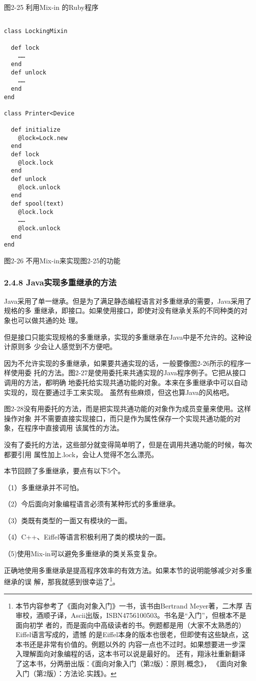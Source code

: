 \documentclass[11pt]{ctexart}
\begin{document}
图2-25 利用Mix-in 的Ruby程序

\lstset{language=org,label= ,caption= ,captionpos=b,numbers=none}
\begin{lstlisting}

class LockingMixin

  def lock
    ……
  end
  def unlock 
    ……
  end
end

class Printer<Device

  def initialize
    @lock=Lock.new
  end
  def lock
    @lock.lock
  end
  def unlock
    @lock.unlock
  end
  def spool(text)
    @lock.lock
    ……
    @lock.unlock
  end
end
\end{lstlisting}

图2-26 不用Mix-in来实现图2-25的功能
\subsubsection{2.4.8 Java实现多重继承的方法}
\label{sec:org2194c7d}

Java采用了单一继承。但是为了满足静态编程语言对多重继承的需要，Java采用了规格的多
重继承，即接口。如果使用接口，即使对没有继承关系的不同种类的对象也可以做共通的处
理。

但是接口只能实现规格的多重继承，实现的多重继承在Java中是不允许的。这种设计原则多
少会让人感觉到不方便吧。

因为不允许实现的多重继承，如果要共通实现的话，一般要像图2-26所示的程序一样使用委
托的方法。图2-27是使用委托来共通实现的Java程序例子。它把从接口调用的方法，都明确
地委托给实现共通功能的对象。本来在多重继承中可以自动实现的，现在要通过手工来实现。
虽然有些麻烦，但这也算Java的风格吧。

图2-28没有用委托的方法，而是把实现共通功能的对象作为成员变量来使用。这样操作对象
并不需要直接实现接口，而只是作为属性保存一个实现共通功能的对象，在程序中直接调用
该属性的方法。

没有了委托的方法，这些部分就变得简单明了，但是在调用共通功能的时候，每次都要引用
属性加上.lock，会让人觉得不怎么漂亮。


本节回顾了多重继承，要点有以下5个。

（1）多重继承并不可怕。

（2）今后面向对象编程语言必须有某种形式的多重继承。

（3）类既有类型的一面又有模块的一面。

（4）C++、Eiffel等语言积极利用了类的模块的一面。

（5)使用Mix-in可以避免多重继承的类关系变复杂。

正确地使用多重继承是提高程序效率的有效方法。如果本节的说明能够减少对多重继承的误
解，那我就感到很幸运了\footnote{本节内容参考了《面向对象入门》一书，该书由Bertrand Meyer著，二木厚
吉审校，酒顺子译，Ascii出版，ISBN4756100503。书名是“入门”，但根本不是面向初学
者的，而是面向中高级读者的书。例题都是用（大家不太熟悉的）Eiffel语言写成的，遗憾
的是Eiffel本身的版本也很老，但即使有这些缺点，这本书还是非常有价值的。例题以外的
内容一点也不过时。如果想要进一步深入理解面向对象编程的话，这本书可以说是最好的。
还有，翔泳社重新翻译了这本书，分两册出版：《面向对象入门（第2版）：原则.概念》，
《面向对象入门（第2版）：方法论.实践》。}。
\end{document}
